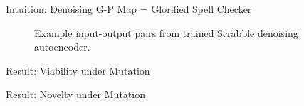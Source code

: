 \begin{frame}{Intuition: Denoising G-P Map = Glorified Spell Checker}

\begin{figure}

\centering \Huge


%
%
%
%


\vspace{1ex}

\caption{
Example input-output pairs from trained Scrabble denoising autoencoder.
}

\end{figure}

\end{frame}

\begin{frame}{Result: Viability under Mutation}



\end{frame}

\begin{frame}{Result: Novelty under Mutation}



\end{frame}
